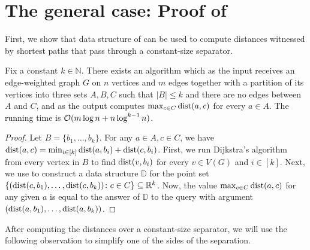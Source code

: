 \section{The general case: Proof of \texorpdfstring{}{Theorem 1.6}}\label{sec:algo}

First, we show that data structure of  can be used to compute distances witnessed by shortest paths that pass through a constant-size separator.

\begin{lemma}\label{l:single_adhesion}
Fix a constant $k \in \mathbb{N}$. There exists an algorithm which as the input receives an edge-weighted graph $G$ on $n$ vertices and $m$ edges together with a partition of its vertices into three sets $A, B, C$ such that $|B| \leq k$ and there are no edges between $A$ and $C$, and as the output computes $\max_{c \in C} \mathrm{dist}(a, c)$ for every $a \in A$. The running time is $\mathcal{O}(m \log n + n \log^{k - 1} n)$.
\end{lemma}

\begin{proof}
Let $B = \{b_1, \ldots, b_k\}$. For any $a \in A, c \in C$, we have $\mathrm{dist}(a, c) = \min_{i \in [k]} \mathrm{dist}(a, b_i) + \mathrm{dist}(c, b_i)$. First, we run Dijkstra's algorithm from every vertex in $B$ to find $\mathrm{dist}(v, b_i)$ for every $v \in V(G)$ and $i \in [k]$. Next, we use  to construct a data structure $\mathbb{D}$ for the point set $\{(\mathrm{dist}(c, b_1), \dots, \mathrm{dist}(c, b_k))\colon c\in C\}\subseteq \mathbb{R}^k$. Now, the value $\max_{c \in C} \mathrm{dist}(a, c)$ for any given $a$ is equal to the answer of $\mathbb{D}$ to the query with argument $(\mathrm{dist}(a, b_1), \dots, \mathrm{dist}(a, b_k))$.
\end{proof}

After computing the distances over a constant-size separator, we will use the following observation to simplify one of the sides of the separation.

